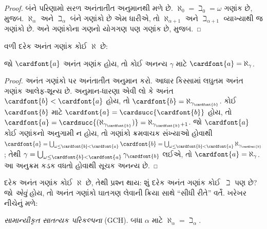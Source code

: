 \documentclass[../../../include/open-logic-section]{subfiles}
\begin{document}
\begin{proof}
બંને પરિણામો સરળ અનંતાતીત અનુમાનથી મળે છે.
$\aleph_0 = \beth_0 = \omega$ ગણાંક છે,
 મુજબ.
$\aleph_\alpha$ અને $\beth_\alpha$ બંને ગણાંકો
છે એમ ધારીએ, તો $\aleph_{\alpha+1}$ અને
$\beth_{\alpha+1}$ વ્યાખ્યાથી જ ગણાંકો છે.
અને ગણાંકોના ગણનો યોગગણ પણ ગણાંક છે,
 મુજબ.
\end{proof}
\noindent
વળી દરેક અનંત ગણાંક કોઈ $\aleph$ છે:

\begin{prop}
જો $\cardfont{a}$ અનંત ગણાંક હોય, તો કોઈ અનન્ય
$\gamma$ માટે $\cardfont{a} = \aleph_\gamma$.
\end{prop}

\begin{proof}
અનંત ગણાંકો પર અનંતાતીત અનુમાન કરો. આધાર
કિસ્સામાં લઘુતમ અનંત ગણાંક આલેફ-શૂન્ય છે.
અનુમાન-ધારણા એવી લો કે અનંત
$\cardfont{b} < \cardfont{a}$ હોય,
તો $\cardfont{b} = \aleph_{\gamma_\cardfont{b}}$.
કોઈ $\cardfont{b}$ માટે
$\cardfont{a} = \cardsucc{\cardfont{b}}$ હોય, તો
$\cardfont{a} = \cardsucc{(\aleph_{\gamma_\cardfont{b}})}=
\aleph_{\gamma_\cardfont{b}+1}$. જો $\cardfont{a}$
કોઈ ગણાંકનો અનુગામી ન હોય, તો ગણાંકો ક્રમવાચક
સંખ્યાઓ હોવાથી
$\cardfont{a} = \bigcup_{\omega \leq \cardfont{b} < \cardfont{a}} \cardfont{b} =
\bigcup_{\omega \leq \cardfont{b} < \cardfont{a}}{\aleph_{\gamma_\cardfont{b}}}$;
તેથી $\gamma = \bigcup_{\omega \leq \cardfont{b} <
\cardfont{a}}\gamma_\cardfont{b}$ લઈએ, તો
$\cardfont{a} = \aleph_\gamma$. આ અનુક્રમ કડક
વધતો હોવાથી સૂચક અનન્ય છે.
\end{proof}

દરેક અનંત ગણાંક કોઈ $\aleph$ છે, તેથી પ્રશ્ન થાય:
શું દરેક અનંત ગણાંક કોઈ~$\beth$ પણ છે? જો
\emph{એવું} હોય, તો અનંત ગણાંકો ઘાતગણ લેવાની
ક્રિયા સાથે ``સીધી રીતે'' વર્તે. ખરેખર નીચેનું
મળે:

\begin{defish}
\emph{સામાન્યીકૃત સાતત્યક પરિકલ્પના} (GCH).
બધા $\alpha$ માટે $\aleph_\alpha  = \beth_\alpha$.
\end{defish}
\end{document}
